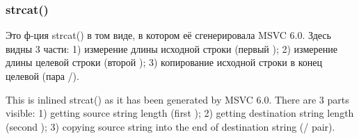 \subsubsection{strcat()}

\ifdefined\RUSSIAN
Это ф-ция strcat() в том виде, в котором её сгенерировала MSVC 6.0.
Здесь видны 3 части:
1) измерение длины исходной строки (первый );
2) измерение длины целевой строки (второй );
3) копирование исходной строки в конец целевой (пара /).
\fi %

\ifdefined\ENGLISH
This is inlined strcat() as it has been generated by MSVC 6.0.
There are 3 parts visible:
1) getting source string length (first );
2) getting destination string length (second );
3) copying source string into the end of destination string (/ pair).
\fi %



